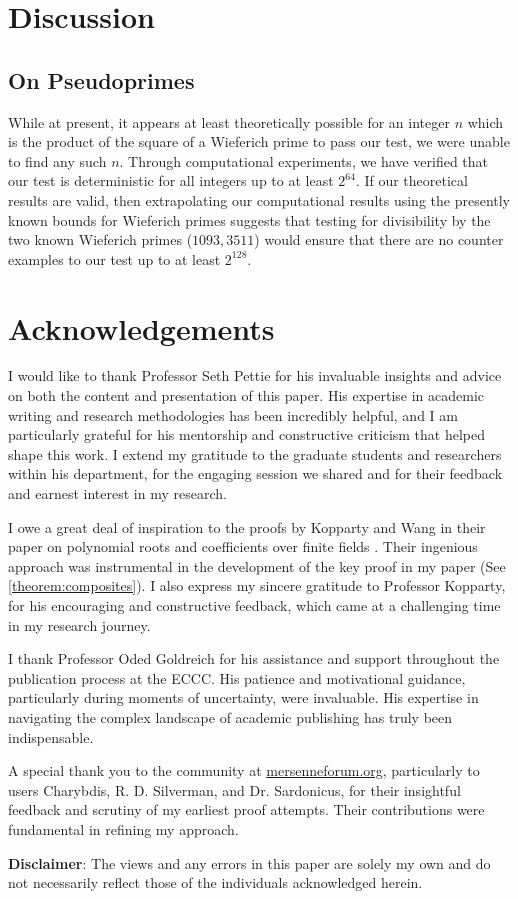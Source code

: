 \documentclass{article}
\theoremstyle{plain}
\theoremstyle{definition}
\begin{document}
\section{Discussion}

\subsection{On Pseudoprimes}
While at present, it appears at least theoretically possible for an integer $n$ which is the product of the square of a Wieferich prime to pass our test, we were unable to find any such $n$. Through computational experiments, we have verified that our test is deterministic for all integers up to at least $2^{64}$. If our theoretical results are valid, then extrapolating our computational results using the presently known bounds for Wieferich primes \cite{primegridww} suggests that testing for divisibility by the two known Wieferich primes ($1093, 3511$) would ensure that there are no counter examples to our test up to at least $2^{128}$.

\section{Acknowledgements}
I would like to thank Professor Seth Pettie for his invaluable insights and advice on both the content and presentation of this paper. His expertise in academic writing and research methodologies has been incredibly helpful, and I am particularly grateful for his mentorship and constructive criticism that helped shape this work. I extend my gratitude to the graduate students and researchers within his department, for the engaging session we shared and for their feedback and earnest interest in my research.

I owe a great deal of inspiration to the proofs by Kopparty and Wang in their paper on polynomial roots and coefficients over finite fields \cite{koppartywang2014roots}. Their ingenious approach was instrumental in the development of the key proof in my paper (See \cref{theorem:composites}). I also express my sincere gratitude to Professor Kopparty, for his encouraging and constructive feedback, which came at a challenging time in my research journey.

I thank Professor Oded Goldreich for his assistance and support throughout the publication process at the ECCC. His patience and motivational guidance, particularly during moments of uncertainty, were invaluable. His expertise in navigating the complex landscape of academic publishing has truly been indispensable.

A special thank you to the community at \url{mersenneforum.org}, particularly to users Charybdis, R. D. Silverman, and Dr. Sardonicus, for their insightful feedback and scrutiny of my earliest proof attempts. Their contributions were fundamental in refining my approach.

\textbf{Disclaimer}: The views and any errors in this paper are solely my own and do not necessarily reflect those of the individuals acknowledged herein.

\begingroup
\raggedright


\endgroup
\end{document}
